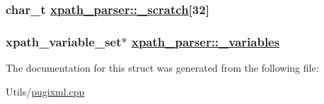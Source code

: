 \hypertarget{structxpath__parser_a9180a17c8ec28977928c815c3425a79}{
\subsubsection[\_\-scratch]{\setlength{\rightskip}{0pt plus 5cm}char\_\-t \hyperlink{structxpath__parser_a9180a17c8ec28977928c815c3425a79}{xpath\_\-parser::\_\-scratch}\mbox{[}32\mbox{]}}}
\label{structxpath__parser_a9180a17c8ec28977928c815c3425a79}


\hypertarget{structxpath__parser_3e0adfea7cc81c08b97ee1375831df6c}{
\subsubsection[\_\-variables]{\setlength{\rightskip}{0pt plus 5cm}xpath\_\-variable\_\-set$\ast$ \hyperlink{structxpath__parser_3e0adfea7cc81c08b97ee1375831df6c}{xpath\_\-parser::\_\-variables}}}
\label{structxpath__parser_3e0adfea7cc81c08b97ee1375831df6c}




The documentation for this struct was generated from the following file:\begin{CompactItemize}
\item 
Utils/\hyperlink{pugixml_8cpp}{pugixml.cpp}\end{CompactItemize}
